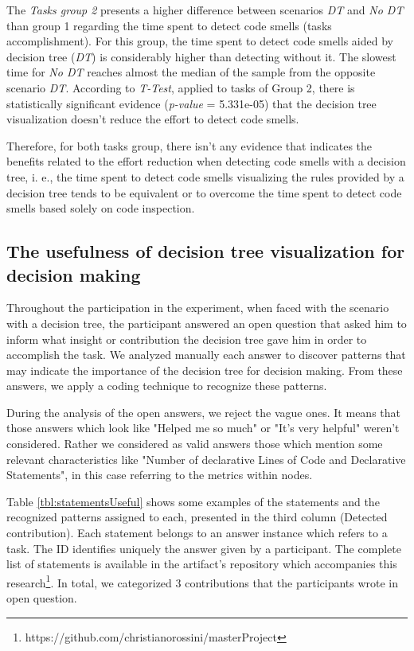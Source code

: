 The \textit{Tasks group 2} presents a higher difference between scenarios \textit{DT} and \textit{No DT} than group 1 regarding the time spent to detect code smells (tasks accomplishment). For this group, the time spent to detect code smells aided by decision tree (\textit{DT}) is considerably higher than detecting without it. The slowest time for \textit{No DT} reaches almost the median of the sample from the opposite scenario \textit{DT}. According to \textit{T-Test}, applied to tasks of Group 2, there is statistically significant evidence (\textit{p-value} = 5.331e-05) that the decision tree visualization doesn't reduce the effort to detect code smells. 

Therefore, for both tasks group, there isn't any evidence that indicates the benefits related to the effort reduction when detecting code smells with a decision tree, i. e., the time spent to detect code smells visualizing the rules provided by a decision tree tends to be equivalent or to overcome the time spent to detect code smells based solely on code inspection. 

\subsection{The usefulness of decision tree visualization for decision making} \label{sec:usefulnessDecisionTree}

Throughout the participation in the experiment, when faced with the scenario with a decision tree, the participant answered an open question that asked him to inform what insight or contribution the decision tree gave him in order to accomplish the task. We analyzed manually each answer to discover patterns that may indicate the importance of the decision tree for decision making.  From these answers, we apply a coding technique \cite{seaman1999qualitative} to recognize these patterns. 

During the analysis of the open answers, we reject the vague ones. It means that those answers which look like "Helped me so much" or  "It's very helpful" weren't considered. Rather we considered as valid answers those which mention some relevant characteristics like "Number of declarative Lines of Code and Declarative Statements", in this case referring to the metrics within nodes.

Table \ref{tbl:statementsUseful} shows some examples of the statements and the recognized patterns assigned to each, presented in the third column (Detected contribution). Each statement belongs to an answer instance which refers to a task. The ID identifies uniquely the answer given by a participant. The complete list of statements is available in the artifact's repository which accompanies this research\footnote{https://github.com/christianorossini/masterProject}. In total, we categorized 3 contributions that the participants wrote in open question.

